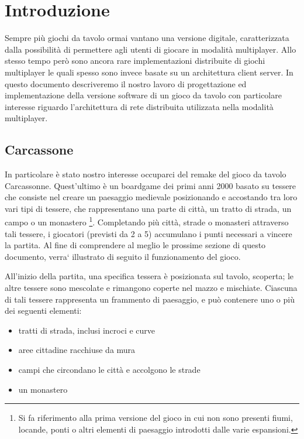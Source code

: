 \section{Introduzione}
Sempre più giochi da tavolo ormai vantano una versione digitale,
caratterizzata dalla possibilità di permettere agli utenti di giocare in
modalità multiplayer.
Allo stesso tempo però sono ancora rare implementazioni distribuite di
giochi multiplayer le quali spesso sono invece basate su un architettura
client server. In questo documento descriveremo il nostro lavoro di
progettazione ed implementazione della versione software di un gioco da
tavolo con particolare interesse riguardo l'architettura di rete
distribuita utilizzata nella modalità multiplayer.

\subsection{Carcassone}
In particolare è stato nostro interesse occuparci del remake del gioco
da tavolo Carcassonne. Quest'ultimo è un boardgame dei
primi anni 2000 basato su tessere che consiste nel creare un paesaggio medievale 
posizionando e accostando tra loro vari tipi di tessere, che rappresentano una parte di città, 
un tratto di strada, un campo o un monastero \footnote{Si fa riferimento
alla prima versione del gioco in cui non sono presenti fiumi, locande,
ponti o altri elementi di paesaggio introdotti dalle varie espansioni.}.
Completando più città, strade o monasteri attraverso tali tessere, i
giocatori (previsti da 2 a 5) accumulano i punti necessari a vincere la partita.
Al fine di comprendere al meglio le prossime sezione di questo documento, 
verra` illustrato di seguito il funzionamento del gioco.

All'inizio della partita, una specifica tessera è posizionata sul tavolo, scoperta; 
le altre tessere sono mescolate e rimangono coperte nel mazzo e mischiate.
Ciascuna di tali tessere rappresenta un frammento di paesaggio, e può contenere uno o più dei seguenti elementi:

\begin{itemize}
	\item tratti di strada, inclusi incroci e curve
    \item aree cittadine racchiuse da mura
    \item campi che circondano le città e accolgono le strade
    \item un monastero
\end{itemize}



